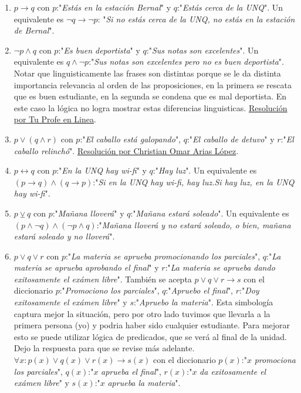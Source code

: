 \documentclass[a4paper]{article}
\newcommand{\then}{\to}
\newcommand{\eq}{\leftrightarrow}
\newcommand{\xor}{\veebar}
\begin{document}
\begin{enumerate}
\begin{enumerate} [label=(\alph*)]
		\item $p\then q$ con $p$:"\textit{Estás en la estación Bernal}" y $q$:"\textit{Estás cerca de la UNQ}". Un equivalente es $\neg q \then \neg p$: "\textit{Si no estás cerca de la UNQ, no estás en la estación de Bernal}".
		\item $\neg p \land q$ con $p$:"\textit{Es buen deportista}" y $q$:"\textit{Sus notas son excelentes}". Un equivalente es $q \land \neg p$:"\textit{Sus notas son excelentes pero no es buen deportista}". Notar que linguisticamente las frases son distintas porque se le da distinta importancia relevancia al orden de las proposiciones, en la primera se rescata que es buen estudiante, en la segunda se condena que es mal deportista. En este caso la lógica no logra mostrar estas diferencias linguisticas. \href{https://youtu.be/HXzyX5XGPp8?t=503}{Resolución por Tu Profe en Linea}.
		\item $p \lor (q \land r)$ con $p$:"\textit{El caballo está galopando}", $q$:"\textit{El caballo de detuvo}" y $r$:"\textit{El caballo relinchó}". \href{https://youtu.be/TgwraosKUuY?t=70}{Resolución por Christian Omar Arias López}.
		\item $p\eq q$ con $p$:"\textit{En la UNQ hay wi-fi}" y $q$:"\textit{Hay luz}". Un equivalente es $(p \then q) \land (q \then p)$:"\textit{Si en la UNQ hay wi-fi, hay luz.Si hay luz, en la UNQ hay wi-fi}".
		\item $p \xor q$ con $p$:"\textit{Mañana lloverá}" y $q$:"\textit{Mañana estará soleado}". Un equivalente es $(p \land \neg q) \land (\neg p \land q)$:"\textit{Mañana lloverá y no estará soleado, o bien, mañana estará soleado y no lloverá}". 
		\item $p \lor q \lor r$ con $p$:"\textit{La materia se aprueba promocionando los parciales}", $q$:"\textit{La materia se aprueba aprobando el final}" y $r$:"\textit{La materia se aprueba dando exitosamente el exámen libre}". También se acepta $p \lor q \lor r \then s$ con el diccionario $p$:"\textit{Promociono los parciales}", $q$:"\textit{Apruebo el final}", $r$:"\textit{Doy exitosamente el exámen libre}" y $s$:"\textit{Apruebo la materia}". Esta simbología captura mejor la situación, pero por otro lado tuvimos que llevarla a la primera persona (yo) y podria haber sido cualquier estudiante. Para mejorar esto se puede utilizar lógica de predicados, que se verá al final de la unidad. Dejo la respuesta para que se revise más adelante. $\forall x: p(x) \lor q(x) \lor r(x) \then s(x)$ con el diccionario $p(x)$:"$x$ \textit{promociona los parciales}", $q(x)$:"$x$ \textit{aprueba el final}", $r(x)$:"$x$ \textit{da exitosamente el exámen libre}" y $s(x)$:"$x$ \textit{aprueba la materia}".

\end{enumerate}
\end{enumerate}
\end{document}
